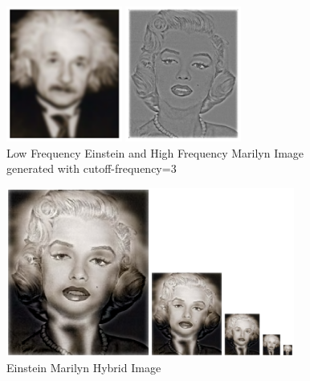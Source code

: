 \documentclass[12pt]{report}
\begin{document}
\begin{figure}[H]
    \centering
    \begin{minipage}{0.45\textwidth}
            \centering
            \includegraphics[height=12em]{./images/einstein_low.png}
        \end{minipage}
        \begin{minipage}{0.45\textwidth}
            \centering
            \includegraphics[height=12em]{./images/marilyn_high.png}
        \end{minipage}
        \caption{Low Frequency Einstein and High Frequency Marilyn Image generated with cutoff-frequency=3}
        \label{einstein_marilyn_low_high}
\end{figure}
\begin{figure}[H]
    \centering
        \includegraphics[height=15em]{./images/einstein_marilyn_hybrid.png}
        \caption{Einstein Marilyn Hybrid Image}
        \label{einstein_marilyn_hybrid}
\end{figure}
\end{document}
